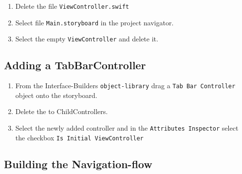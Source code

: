 \documentclass{article}
\begin{document}
\begin{enumerate}
\def\labelenumi{\arabic{enumi}.}

\item
  Delete the file \texttt{ViewController.swift}
\item
  Select file \texttt{Main.storyboard} in the project navigator.
\item
  Select the empty \texttt{ViewController} and delete it.
\end{enumerate}

\subsection{Adding a TabBarController}\label{adding-a-tabbarcontroller}

\begin{enumerate}
\item
  From the Interface-Builders \texttt{object-library} drag a
  \texttt{Tab\ Bar\ Controller} object onto the storyboard.
\item
  Delete the to ChildControllers.
\item
  Select the newly added controller and in the
  \texttt{Attributes\ Inspector} select the checkbox
  \texttt{Is\ Initial\ ViewController}
\end{enumerate}

\subsection{Building the Navigation-flow}\label{building-the-navigation-flow}
\end{document}
